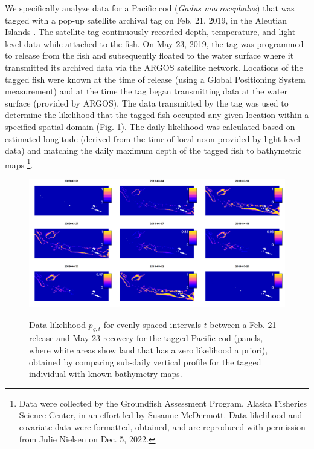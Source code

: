 We specifically analyze data for a Pacific cod (\textit{Gadus macrocephalus}) that was tagged with a pop-up satellite archival tag on Feb. 21, 2019, in the Aleutian Islands \cite{bryan_seasonal_2021}. The satellite tag continuously recorded depth, temperature, and light-level data while attached to the fish.  On May 23, 2019, the tag was programmed to release from the fish and subsequently floated to the water surface where it transmitted its archived data via the ARGOS satellite network. Locations of the tagged fish were known at the time of release (using a Global Positioning System measurement) and at the time the tag began transmitting data at the water surface (provided by ARGOS). The data transmitted by the tag was used to determine the likelihood that the tagged fish occupied any given location within a specified spatial domain (Fig. \ref{fig:Chap10_data_likelihood}). The daily likelihood was calculated based on estimated longitude (derived from the time of local noon provided by light-level data) and matching the daily maximum depth of the tagged fish to bathymetric maps \cite{nielsen_geolocation_2023}\footnote{Data were collected by the Groundfish Assessment Program, Alaska Fisheries Science Center, in an effort led by Susanne McDermott. Data likelihood and covariate data were formatted, obtained, and are reproduced with permission from Julie Nielsen on Dec. 5, 2022.}.

\begin{figure}[!ht]
    \caption[Data likelihood for tagged cod]{Data likelihood \( p_{g,t} \) for evenly spaced intervals \(t\) between a Feb. 21 release and May 23 recovery for the tagged Pacific cod (panels, where white areas show land that has a zero likelihood a priori), obtained by comparing sub-daily vertical profile for the tagged individual with known bathymetry maps.}
    \includegraphics[width=5.5in]{Chap_10/Data_likelihood_3.png}
    \label{fig:Chap10_data_likelihood}
\end{figure}

